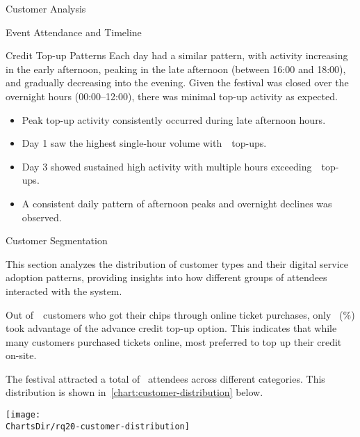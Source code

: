 \begin{section}{Customer Analysis}
\begin{subsection}{Event Attendance and Timeline}
\begin{subsubsection}{Credit Top-up Patterns}
			Each day had a similar pattern, with activity increasing in the early afternoon, peaking in the late afternoon (between 16:00 and 18:00), and gradually decreasing into the evening.
			Given the festival was closed over the overnight hours (00:00--12:00), there was minimal top-up activity as expected.

			\begin{keytakeaways}
				\begin{itemize}
					\item Peak top-up activity consistently occurred during late afternoon hours.
					\item Day 1 saw the highest single-hour volume with~~top-ups.
					\item Day 3 showed sustained high activity with multiple hours exceeding~~top-ups.
					\item A consistent daily pattern of afternoon peaks and overnight declines was observed.
				\end{itemize}
			\end{keytakeaways}
		\end{subsubsection}
	\end{subsection}


	\begin{subsection}{Customer Segmentation}
		\label{subsec:analysis-customer-segmentation}

		This section analyzes the distribution of customer types and their digital service adoption patterns, providing insights into how different groups of attendees interacted with the system.


		Out of~~customers who got their chips through online ticket purchases, only ~(\%) took advantage of the advance credit top-up option.
		This indicates that while many customers purchased tickets online, most preferred to top up their credit on-site.


		The festival attracted a total of~ attendees across different categories.
		This distribution is shown in~\autoref{chart:customer-distribution} below.

		\begin{chart}[H]
			\centering
			\texttt{[image: \\ChartsDir/rq20-customer-distribution]}
			\caption{ Customer Distribution by Type}
			\label{chart:customer-distribution}
			\source
		\end{chart}


\end{subsection}
\end{section}
